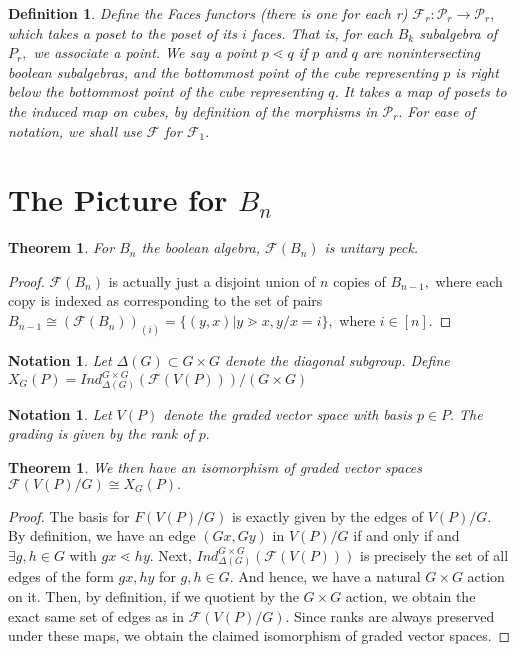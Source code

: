 \documentclass{amsart}
\newtheorem{thm}[subsubsection]{Theorem}
\newtheorem{defn}[subsubsection]{Definition}
\newtheorem{note}[subsubsection]{Notation}
\begin{document}
\begin{defn}
Define the Faces functors (there is one for each r) $\mathcal F_r:\mathcal P_r \rightarrow \mathcal P_r,$ which takes a poset to the poset of its $i$ faces. That is, for each $B_k$ subalgebra of $P_r,$ we associate a point. We say a point $p \lessdot q$ if $p$ and $q$ are nonintersecting boolean subalgebras, and the bottommost point of the cube representing $p$ is right below the bottommost point of the cube representing $q$. It takes a map of posets to the induced map on cubes, by definition of the morphisms in $\mathcal P_r.$ For ease of notation, we shall use $\mathcal F$ for $\mathcal F_1.$
\end{defn}

\section{The Picture for $B_n$}

\begin{thm}
\label{boolean_edge_peck}
For $B_n$ the boolean algebra, $\mathcal F(B_n)$ is unitary peck.
\end{thm}
\begin{proof}
$\mathcal F(B_n)$ is actually just a disjoint union of $n$ copies of $B_{n-1},$ where each copy is indexed as corresponding to the set of pairs $B_{n-1} \cong (\mathcal F(B_n))_{(i)} =\{(y,x)|y\gtrdot x,y/x = i\},$ where $i \in [n].$
\end{proof}
\begin{note}
Let $\Delta(G) \subset G\times G$ denote the diagonal subgroup.
Define $X_G(P) = Ind_{\Delta(G)}^{G\times G}(\mathcal F(V(P)))/(G\times G)$
\end{note}

\begin{note}
Let $V(P)$ denote the graded vector space with basis $p \in P.$ The grading is given by the rank of $p.$
\end{note}

\begin{thm}
\label{xg_isomorphism} We then have an isomorphism of graded vector spaces $\mathcal F(V(P)/G)\cong X_G(P).$
\end{thm}
\begin{proof}
The basis for $F(V(P)/G)$ is exactly given by the edges of $V(P)/G.$ By definition, we have an edge $(Gx,Gy)$ in $V(P)/G$ if and only if and $\exists g,h \in G$ with $gx \lessdot hy.$ Next, $Ind_{\Delta(G)}^{G\times G}(\mathcal F(V(P)))$ is precisely the set of all edges of the form $gx,hy$ for $g,h \in G.$ And hence, we have a natural $G \times G$ action on it. Then, by definition, if we quotient by the $G\times G$ action, we obtain the exact same set of edges as in $\mathcal F(V(P)/G).$ Since ranks are always preserved under these maps, we obtain the claimed isomorphism of graded vector spaces.
\end{proof}
\end{document}
